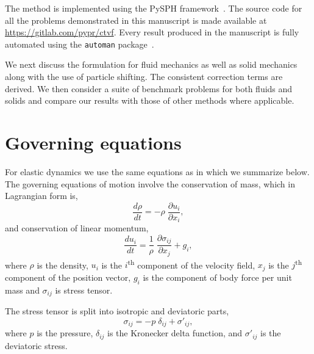 \documentclass[preprint,12pt]{elsarticle}
\begin{document}
The method is implemented using the PySPH
framework~\cite{PR:pysph:scipy16,pysph2020}. The source code for all the
problems demonstrated in this manuscript is made available at
\url{https://gitlab.com/pypr/ctvf}. Every result produced in the manuscript is
fully automated using the \texttt{automan} package~\cite{pr:automan:2018}.

We next discuss the formulation for fluid mechanics as well as solid mechanics
along with the use of particle shifting. The consistent correction terms are
derived. We then consider a suite of benchmark problems for both fluids and
solids and compare our results with those of other methods where applicable.



\section{Governing equations}


For elastic dynamics we use the same equations as in
\cite{gray-ed-2001,zhang_hu_adams17} which we summarize below. The governing
equations of motion involve the conservation of mass, which in Lagrangian
form is,
\begin{equation}
  \label{eq:ce}
  \frac{d \rho}{d t} = - \rho \; \frac{\partial u_i}{\partial x_i},
\end{equation}
and conservation of linear momentum,
\begin{equation}
  \label{eq:me}
  \frac{d u_i}{d t} = \frac{1}{\rho} \; \frac{\partial \sigma_{ij}}{\partial x_j}
  + g_i,
\end{equation}
where $\rho$ is the density, $u_i$ is the $i$\textsuperscript{th} component of
the velocity field, $x_j$ is the $j$\textsuperscript{th} component of the
position vector, $g_i$ is the component of body force per unit mass and
$\sigma_{ij}$ is stress tensor.

The stress tensor is split into isotropic and deviatoric parts,
\begin{equation}
  \label{eq:stress_tensor_decomposition}
  \sigma_{ij} = - p \; \delta_{ij} + \sigma'_{ij},
\end{equation}
%
where $p$ is the pressure, $\delta_{ij}$ is the Kronecker delta function, and
$\sigma'_{ij}$ is the deviatoric stress.
\end{document}
